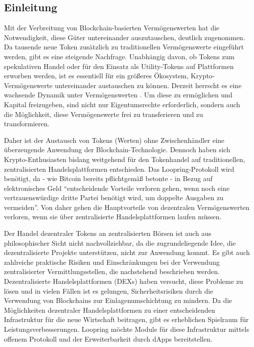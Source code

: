 \documentclass[UTF8,nofonts]{article}
\begin{document}
\begin{multicols}{2}
\section{Einleitung\label{sec:introduction}}
Mit der Verbreitung von Blockchain-basierten Vermögenswerten hat die Notwendigkeit, diese Güter untereinander auszutauschen, deutlich zugenommen. Da tausende neue Token zusätzlich zu traditionellen Vermögenswerte eingeführt werden, gibt es eine steigende Nachfrage. Unabhängig davon, ob Tokens zum spekulativen Handel oder für den Einsatz als Utility-Tokens auf Plattformen erworben werden, ist es essentiell für ein größeres Ökosystem, Krypto-Vermögenswerte untereinander austauschen zu können. Derzeit herrscht es eine wachsende Dynamik unter Vermögenswerten \cite{desotocapital}. Um diese zu ermöglichen und Kapital freizugeben, sind nicht nur Eigentumsrechte erforderlich, sondern auch die Möglichkeit, diese Vermögenswerte frei zu transferieren und zu transformieren.

Daher ist der Austausch von Tokens (Werten) ohne Zwischenhändler eine überzeugende Anwendung der Blockchain-Technologie. Dennoch haben sich Krypto-Enthusiasten bislang weitgehend für den Tokenhandel auf traditionellen, zentralisierten Handelsplattformen entschieden. Das Loopring-Protokoll wird benötigt, da - wie Bitcoin \cite{nakamoto2008bitcoin} bereits pflichtgemäß betonte - in Bezug auf elektronisches Geld \enquote{entscheidende Vorteile verloren gehen, wenn noch eine vertrauenswürdige dritte Partei benötigt wird, um doppelte Ausgaben zu vermeiden}. Von daher gehen die Hauptvorteile von dezentralen Vermögenswerten verloren, wenn sie über zentralisierte Handelsplattformen laufen müssen.

Der Handel dezentraler Tokens an zentralisierten Börsen ist auch aus philosophischer Sicht nicht nachvollziehbar, da die zugrundeliegende Idee, die dezentralisierte Projekte unterstützen, nicht zur Anwendung kommt. Es gibt auch zahlreiche praktische Risiken und Einschränkungen bei der Verwendung zentralisierter Vermittlungsstellen, die nachstehend beschrieben werden. Dezentralisierte Handelsplattformen (DEXs) \cite{schuh2015bitshares} \cite{bancor} \cite{kyber} haben versucht, diese Probleme zu lösen und in vielen Fällen ist es gelungen, Sicherheitsrisiken durch die Verwendung von Blockchains zur Einlagenumschichtung zu mindern. Da die Möglichkeiten dezentraler Handelsplattformen zu einer entscheidenden Infrastruktur für die neue Wirtschaft beitragen, gibt es erheblichen Spielraum für Leistungsverbesserungen. Loopring möchte Module für diese Infrastruktur mittels offenem Protokoll und der Erweiterbarkeit durch dApps bereitstellen.


\end{multicols}
\end{document}
